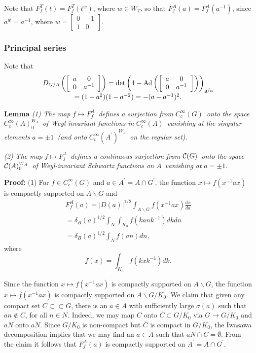 \documentclass[11pt, a4paper]{article}
\begin{document}
Note that $F_f^T(t)=F_f^T(t^w)$, where $w\in W_T$, so that $%
F_f^A(a)=F_f^A(a^{-1})$, since $a^w=a^{-1}$, where $w=\left[ 
\begin{array}{cc}
0 & -1 \\ 
1 & 0
\end{array}
\right] $.

\subsubsection{Principal series}

Note that
\[
\begin{array}{c}
D_{G/A}\left(\left[ 
\begin{array}{cc}
a & 0 \\ 
0 & a^{-1}
\end{array}
\right] \right)=\det \left(1-\mathrm{Ad}\left(\left[ 
\begin{array}{cc}
a & 0 \\ 
0 & a^{-1}
\end{array}
\right] \right)\right)_{{\frak g}/{\frak a}} \\ 
=(1-a^2)(1-a^{-2})=-(a-a^{-1})^2.
\end{array}
\]

{\bf Lemma} {\em (1) The map }$f\longmapsto F_f^A${\em \ defines a
surjection from }$C_c^\infty (G)${\em \ onto the space }$C_c^\infty (A)_0^{W_A}${\em \ of Weyl-invariant functions in }$C_c^\infty (A)${\em \ vanishing at the singular elements }$a=\pm 1${\em \ (and onto }$C_c^\infty (A^{\prime })^{W_A}${\em \ on the regular set).}

{\em (2) The map }$f\longmapsto F_f^A${\em \ defines a continuous surjection from }%
${\cal C}(G)${\em \ onto the space }${\cal C}(A)_0^{W_A}${\em \ of Weyl-invariant Schwartz functions on }$A${\em \ vanishing at }$a=\pm 1$.

{\bf Proof:} (1) For $f\in C_c^\infty (G)$ and $a\in A^{\prime }=A\cap
G^{\prime }$, the function $x\longmapsto f(x^{-1}ax)$ is compactly supported
on $A\backslash G$ and
\[
\begin{array}{c}
F_f^A(a)=|D(a)|^{1/2}\int_{A\backslash G}f(x^{-1}ax) \frac{dx}{da} \\ 
=\delta _B(a)^{1/2}\int_N\int_{K_0}f(kank^{-1})dkdn \\ 
=\delta _B(a)^{1/2}\int_N\overline{f}(an)dn,
\end{array}
\]
where
\[
\overline{f}(x)=\int_{K_0}f(kxk^{-1})dk.
\]

Since the function $x\longmapsto f(x^{-1}ax)$ is compactly supported on $%
A\backslash G$, the function $x\longmapsto \overline{f}(x^{-1}ax)$ is
compactly supported on $A\backslash G/K_0$. We claim that given any compact
set $C\subset \subset G$, there is an $a\in A$ with sufficiently large $%
\sigma (a)$ such that $an\notin C$, for all $n\in N$. Indeed, we may map $C$
onto $\overline{C}\subset G/K_0$ via $G\rightarrow G/K_0$ and $aN$ onto $%
\overline{aN}$. Since $G/K_0$ is non-compact but $\overline{C}$ is compact
in $G/K_0$, the Iwasawa decomposition implies that we may find an $a\in A$
such that $\overline{aN}\cap \overline{C}=\emptyset $. From the claim it
follows that $F_f^A(a)$ is compactly supported on $A^{\prime }=A\cap
G^{\prime }$.
\end{document}
